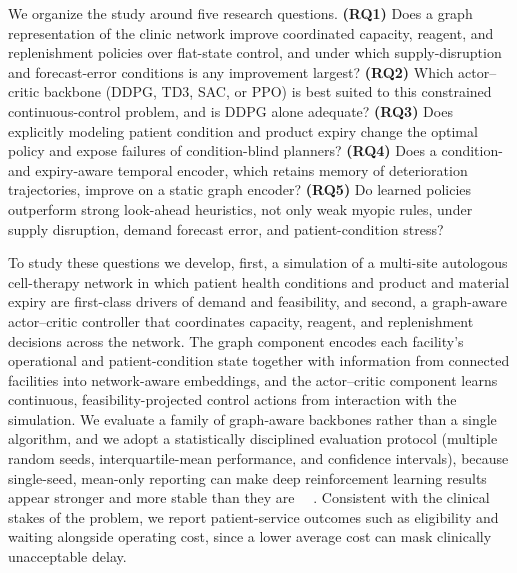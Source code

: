 \documentclass[preprint,review,12pt,nonatbib]{elsarticle}
\providecommand{\DIFadd}[1]{{\protect\color{blue}#1}} %
\providecommand{\DIFdel}[1]{} %
\providecommand{\DIFaddbegin}{} %
\providecommand{\DIFaddend}{} %
\providecommand{\DIFdelbegin}{} %
\providecommand{\DIFdelend}{} %
\providecommand{\DIFscaledelfig}{0.5}
\newlength{\DIFdelgraphicswidth} %
\newlength{\DIFdelgraphicsheight} %
\providecommand{\DIFaddincludegraphics}[2][]{{\color{blue}\fbox{\DIFOincludegraphics[#1]{#2}}}} %
\providecommand{\DIFdelincludegraphics}[2][]{%
\sbox{\DIFdelgraphicsbox}{\DIFOincludegraphics[#1]{#2}}%
\settoboxwidth{\DIFdelgraphicswidth}{\DIFdelgraphicsbox} %
\settoboxtotalheight{\DIFdelgraphicsheight}{\DIFdelgraphicsbox} %
\scalebox{\DIFscaledelfig}{%
\parbox[b]{\DIFdelgraphicswidth}{\usebox{\DIFdelgraphicsbox}\\[-\baselineskip] \rule{\DIFdelgraphicswidth}{0em}}\llap{\resizebox{\DIFdelgraphicswidth}{\DIFdelgraphicsheight}{%
\setlength{\unitlength}{\DIFdelgraphicswidth}%
\begin{picture}(1,1)%
\thicklines\linethickness{2pt} %
{\color[rgb]{1,0,0}\put(0,0){\framebox(1,1){}}}%
{\color[rgb]{1,0,0}\put(0,0){\line( 1,1){1}}}%
{\color[rgb]{1,0,0}\put(0,1){\line(1,-1){1}}}%
\end{picture}%
}\hspace*{3pt}}} %
} %
\DeclareRobustCommand{\DIFaddbegin}{\DIFOaddbegin \let\includegraphics\DIFaddincludegraphics} %
\DeclareRobustCommand{\DIFaddend}{\DIFOaddend \let\includegraphics\DIFOincludegraphics} %
\DeclareRobustCommand{\DIFdelbegin}{\DIFOdelbegin \let\includegraphics\DIFdelincludegraphics} %
\DeclareRobustCommand{\DIFdelend}{\DIFOaddend \let\includegraphics\DIFOincludegraphics} %
\begin{document}
\DIFdelbegin \DIFdel{This paper develops a graph convolutional network }\DIFdelend \DIFaddbegin \DIFadd{We organize the study around five research questions. }\textbf{\DIFadd{(RQ1)}} \DIFadd{Does a graph representation of the clinic network improve coordinated capacity, reagent, and replenishment policies over flat-state control, and under which supply-disruption }\DIFaddend and \DIFdelbegin \DIFdel{a deep deterministic policy gradient framework for intelligent decision support in distributed make-to-order manufacturing}\DIFdelend \DIFaddbegin \DIFadd{forecast-error conditions is any improvement largest? }\textbf{\DIFadd{(RQ2)}} \DIFadd{Which actor--critic backbone (DDPG, TD3, SAC, or PPO) is best suited to this constrained continuous-control problem, and is DDPG alone adequate? }\textbf{\DIFadd{(RQ3)}} \DIFadd{Does explicitly modeling patient condition and product expiry change the optimal policy and expose failures of condition-blind planners? }\textbf{\DIFadd{(RQ4)}} \DIFadd{Does a condition- and expiry-aware temporal encoder, which retains memory of deterioration trajectories, improve on a static graph encoder? }\textbf{\DIFadd{(RQ5)}} \DIFadd{Do learned policies outperform strong look-ahead heuristics, not only weak myopic rules, under supply disruption, demand forecast error, and patient-condition stress?
}

\DIFadd{To study these questions we develop, first, a simulation of a multi-site autologous cell-therapy network in which patient health conditions and product and material expiry are first-class drivers of demand and feasibility, and second, a graph-aware actor--critic controller that coordinates capacity, reagent, and replenishment decisions across the network}\DIFaddend . The graph \DIFdelbegin \DIFdel{convolutional component encodes facility-level states and neighboring-facility information }\DIFdelend \DIFaddbegin \DIFadd{component encodes each facility's operational and patient-condition state together with information from connected facilities }\DIFaddend into network-aware embeddings\DIFdelbegin \DIFdel{. The deep deterministic policy gradient component then learns continuouscapacity, inventory, and transshipment actions from interactions with a production simulationenvironment. The resulting framework is designed to learn adaptive policies without requiring exact prior knowledge of demand distributions or supplier disruption processes. }\DIFdelend \DIFaddbegin \DIFadd{, and the actor--critic component learns continuous, feasibility-projected control actions from interaction with the simulation. We evaluate a family of graph-aware backbones rather than a single algorithm, and we adopt a statistically disciplined evaluation protocol (multiple random seeds, interquartile-mean performance, and confidence intervals), because single-seed, mean-only reporting can make deep reinforcement learning results appear stronger and more stable than they are~\mbox{%
\cite{Henderson2018DRLMatters, Agarwal2021RLiable}}\hskip0pt%
. Consistent with the clinical stakes of the problem, we report patient-service outcomes such as eligibility and waiting alongside operating cost, since a lower average cost can mask clinically unacceptable delay.
}\DIFaddend 
\end{document}
